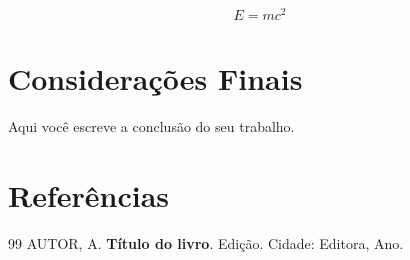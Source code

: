 \documentclass[12pt, a4paper]{article}
\begin{document}
\begin{equation}
    E = mc^2
    \label{eq:exemplo}
\end{equation}

\section{Considerações Finais}

Aqui você escreve a conclusão do seu trabalho.


\newpage
\section*{Referências}

\begin{thebibliography}{99}
     AUTOR, A. \textbf{Título do livro}. Edição. Cidade: Editora, Ano.
\end{thebibliography}
\end{document}
